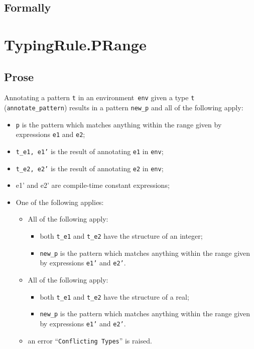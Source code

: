 \documentclass{book}
\begin{document}
\begin{emptyformal}
    \subsection{Formally}
\end{emptyformal}


\section{TypingRule.PRange \label{sec:TypingRule.PRange}}

    \subsection{Prose}
   Annotating a pattern \texttt{t} in an environment~\texttt{env} given a type \texttt{t} (\texttt{annotate\_pattern}) results in a pattern \texttt{new\_p} and all of the following apply:
   \begin{itemize}
   \item \texttt{p} is the pattern which matches anything within the range given by
      expressions \texttt{e1} and \texttt{e2};
   \item \texttt{t\_e1, e1'} is the result of annotating \texttt{e1} in \texttt{env};
   \item \texttt{t\_e2, e2'} is the result of annotating \texttt{e2} in \texttt{env};
   \item e1' and e2' are compile-time constant expressions;
   \item One of the following applies:
     \begin{itemize}
     \item All of the following apply:
           \begin{itemize}
           \item both \texttt{t\_e1} and \texttt{t\_e2} have the structure of an integer;
           \item \texttt{new\_p} is the pattern which matches anything within the range given by
      expressions \texttt{e1'} and \texttt{e2'}.
           \end{itemize}
     \item All of the following apply:
           \begin{itemize}
           \item both \texttt{t\_e1} and \texttt{t\_e2} have the structure of a real;
           \item \texttt{new\_p} is the pattern which matches anything within the range given by
      expressions \texttt{e1'} and \texttt{e2'}.
           \end{itemize}
     \item an error ``\texttt{Conflicting Types}'' is raised.
     \end{itemize}
   \end{itemize}
\end{document}
